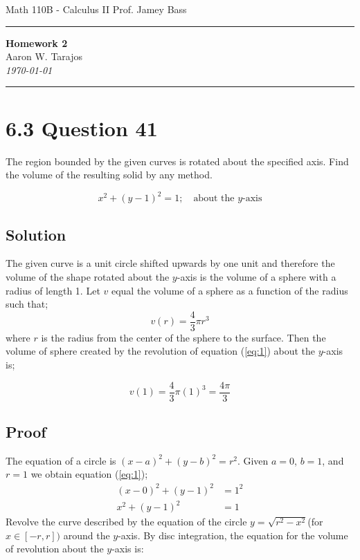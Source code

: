 \documentclass{article}
\begin{document}
\noindent
Math 110B - Calculus II  \hfill Prof. Jamey Bass

\noindent\rule{\textwidth}{0.4pt}

\begin{center}
    \textbf{\LARGE Homework 2} \\
    \vspace{12pt}
    \large Aaron W. Tarajos \\
    \textit{\today}
\end{center}

\noindent\rule{\textwidth}{0.4pt}

\section*{6.3 Question 41}
The region bounded by the given curves is rotated about the specified axis.
Find the volume of the resulting solid by any method.

\begin{equation}\label{eq:1}
	x^2 + (y-1)^2 = 1; \quad \text{about the $y$-axis}
\end{equation}

\subsection*{Solution}
The given curve is a unit circle shifted upwards by one unit and therefore the volume of the shape rotated about the $y$-axis is the volume of a sphere with a radius of length 1.
Let $v$ equal the volume of a sphere as a function of the radius such that;
\begin{equation}
	v(r) = \frac{4}{3}\pi r^3
\end{equation}
where $r$ is the radius from the center of the sphere to the surface.
Then the volume of sphere created by the revolution of equation (\ref{eq:1}) about the $y$-axis is;

\[
	v(1) = \frac{4}{3}\pi (1)^3 = \boxed{\frac{4 \pi}{3}}
\]

\subsection*{Proof}
The equation of a circle is $(x-a)^2 + (y-b)^2 = r^2$. Given $a=0$, $b=1$, and $r=1$ we obtain equation (\ref{eq:1});
\begin{align*}
	(x-0)^2 + (y-1)^2 &= 1^2 \\
	x^2 + (y-1)^2 &= 1
\end{align*}
Revolve the curve described by the equation of the circle $y=\sqrt{r^2-x^2}$(for $x \in \left[ -r,r \right])$ around the $y$-axis.
By disc integration, the equation for the volume of revolution about the $y$-axis is:
\end{document}
